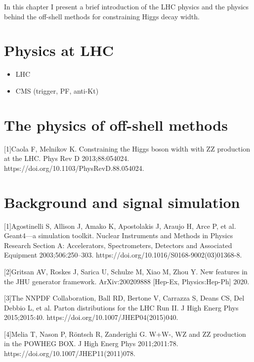 \newpage

In this chapter I present a brief introduction of the
LHC physics and the physics behind the off-shell methods
for constraining Higgs decay width.

\section{Physics at LHC}
\begin{itemize}
    \item LHC
    \item CMS (trigger, PF, anti-Kt)
\end{itemize}
\newpage\phantom{blabla}
\newpage\phantom{blabla}



\section{The physics of off-shell methods}
[1]Caola F, Melnikov K. Constraining the Higgs boson width with ZZ production at the LHC. Phys Rev D 2013;88:054024. https://doi.org/10.1103/PhysRevD.88.054024.

\newpage\phantom{blabla}
\newpage\phantom{blabla}
\newpage\phantom{blabla}


\section{Background and signal simulation}
[1]Agostinelli S, Allison J, Amako K, Apostolakis J, Araujo H, Arce P, et al. Geant4—a simulation toolkit. Nuclear Instruments and Methods in Physics Research Section A: Accelerators, Spectrometers, Detectors and Associated Equipment 2003;506:250–303. https://doi.org/10.1016/S0168-9002(03)01368-8.

[2]Gritsan AV, Roskes J, Sarica U, Schulze M, Xiao M, Zhou Y. New features in the JHU generator framework. ArXiv:200209888 [Hep-Ex, Physics:Hep-Ph] 2020.

[3]The NNPDF Collaboration, Ball RD, Bertone V, Carrazza S, Deans CS, Del Debbio L, et al. Parton distributions for the LHC Run II. J High Energ Phys 2015;2015:40. https://doi.org/10.1007/JHEP04(2015)040.

[4]Melia T, Nason P, Röntsch R, Zanderighi G. W+W-, WZ and ZZ production in the POWHEG BOX. J High Energ Phys 2011;2011:78. https://doi.org/10.1007/JHEP11(2011)078.

\newpage\phantom{blabla}
\newpage\phantom{blabla}


